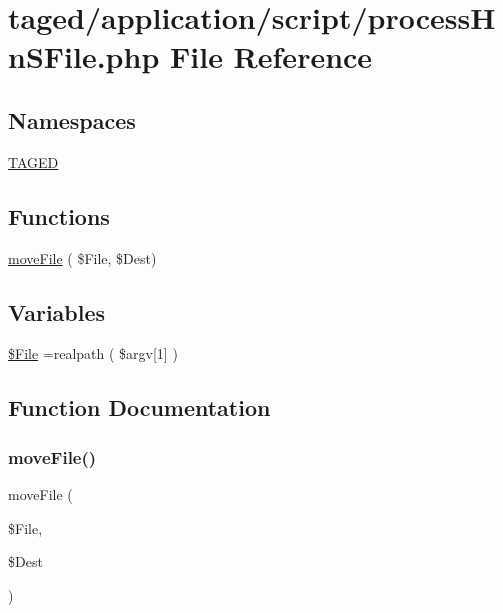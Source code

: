 \hypertarget{process_hn_s_file_8php}{}\section{taged/application/script/process\+Hn\+S\+File.php File Reference}
\label{process_hn_s_file_8php}
\subsection*{Namespaces}
\begin{DoxyCompactItemize}
\item 
 \hyperlink{namespace_t_a_g_e_d}{T\+A\+G\+ED}
\end{DoxyCompactItemize}
\subsection*{Functions}
\begin{DoxyCompactItemize}
\item 
\hyperlink{process_hn_s_file_8php_a27984f6d1feabe8ad934479fdac41eda}{move\+File} ( \$File, \$Dest)
\end{DoxyCompactItemize}
\subsection*{Variables}
\begin{DoxyCompactItemize}
\item 
\hyperlink{process_hn_s_file_8php_a34cd105e27a4cb6632047ddfdfaa07e8}{\$\+File} =realpath ( \$argv\mbox{[}1\mbox{]} )
\end{DoxyCompactItemize}


\subsection{Function Documentation}
\mbox{\label{process_hn_s_file_8php_a27984f6d1feabe8ad934479fdac41eda}} 
\subsubsection{\texorpdfstring{move\+File()}{moveFile()}}
{\footnotesize\ttfamily move\+File (\begin{DoxyParamCaption}\item[{}]{\$\+File,  }\item[{}]{\$\+Dest }\end{DoxyParamCaption})}



